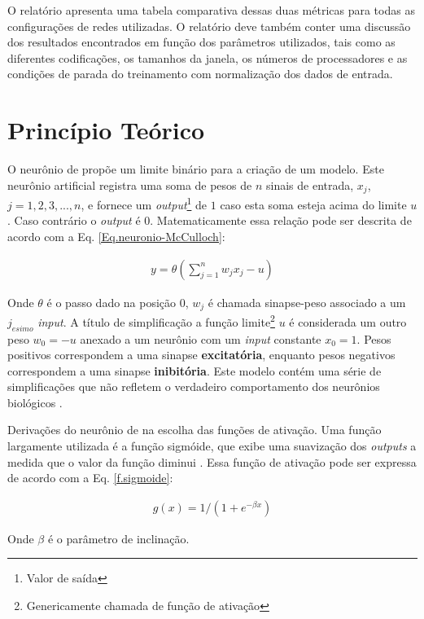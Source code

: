 \documentclass[journal, a4paper]{IEEEtran}
\begin{document}
O relatório apresenta uma tabela comparativa dessas duas métricas para todas as
configurações de redes utilizadas. O relatório deve também conter uma discussão dos
resultados encontrados em função dos parâmetros utilizados, tais como as diferentes
codificações, os tamanhos da janela, os números de processadores e as condições de parada
do treinamento com normalização dos dados de entrada.


\section{Princípio Teórico}
O neurônio de \citet{McCulloch1943} propõe um limite binário para a criação de um modelo. Este neurônio artificial registra uma soma de pesos de $n$ sinais de entrada, $x_{j}$, $j=1,2,3,...,n$, e fornece um \textit{output}\footnote{Valor de saída} de $1$ caso esta soma esteja acima do limite $u$. Caso contrário o \textit{output} é $0$. Matematicamente essa relação pode ser descrita de acordo com a Eq. \ref{Eq.neuronio-McCulloch}:

\begin{eqnarray}
y=\theta \left( \sum^{n}_{j=1} w_{j} x_{j} -u \right)
\label{Eq.neuronio-McCulloch}
\end{eqnarray}

Onde $\theta$ é o passo dado na posição $0$, $w_{j}$ é chamada sinapse-peso associado a um $j_{esimo}$ \textit{input}. A título de simplificação a função limite\footnote{Genericamente chamada de função de ativação} $u$ é considerada um outro peso $w_{0}=-u$ anexado a um neurônio com um \textit{input} constante $x_{0}=1$. Pesos positivos correspondem a uma sinapse \textbf{excitatória}, enquanto pesos negativos correspondem a uma sinapse \textbf{inibitória}. Este modelo contém uma série de simplificações que não refletem o verdadeiro comportamento dos neurônios biológicos \citep{Mao1996}.  

Derivações do neurônio de \citet{McCulloch1943} na escolha das funções de ativação. Uma função largamente utilizada é a função sigmóide, que exibe uma suavização dos \textit{outputs} a medida que o valor da função diminui \citep{Mao1996,Misra2010}. Essa função de ativação pode ser expressa de acordo com a Eq. \ref{f.sigmoide}:

\begin{eqnarray}
g(x)=1/(1+e^{-\beta x})
\label{f.sigmoide}
\end{eqnarray}

Onde $\beta$ é o parâmetro de inclinação. %
\\
\end{document}
